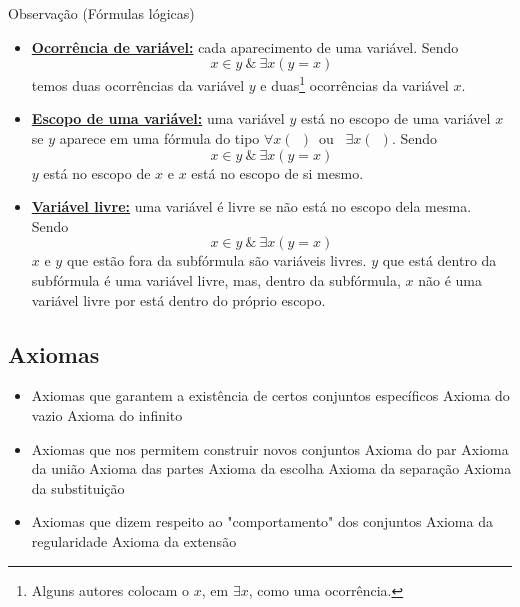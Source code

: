          \begin{mymdframed}{Observação (Fórmulas lógicas)}
            \begin{itemize}
               \item\textbf{\underline{Ocorrência de variável:}} cada aparecimento de uma variável.
                  Sendo $$x \in y\ \&\ \exists x (y = x)$$
                  temos duas ocorrências da variável $y$ e duas\footnote{Alguns autores colocam o $x$, em $\exists x$, como uma ocorrência.} ocorrências da variável $x$.
               \item \textbf{\underline{Escopo de uma variável:}} uma variável $y$ está no escopo de uma variável $x$ se $y$ aparece em uma fórmula do tipo $\forall x (\ \ )$\ ou \ $\exists x (\ \ )$.
                  Sendo $$x \in y\ \& \ \exists x (y = x)$$
                  $y$ está no escopo de $x$ e $x$ está no escopo de si mesmo.
               \item \textbf{\underline{Variável livre:}} uma variável é livre se não está no escopo dela mesma.
                  Sendo $$x \in y\ \& \ \exists x (y = x)$$
                  $x$ e $y$ que estão fora da subfórmula são variáveis livres. $y$ que está dentro da subfórmula é uma variável livre, mas, dentro da subfórmula, $x$ não é uma variável livre por está dentro do próprio escopo.
            \end{itemize}
         \end{mymdframed}

   \subsection{Axiomas}
      \begin{itemize}
         \item Axiomas que garantem a existência de certos conjuntos específicos
            \subitem Axioma do vazio
            \subitem Axioma do infinito    
         \item Axiomas que nos permitem construir novos conjuntos
            \subitem Axioma do par
            \subitem Axioma da união
            \subitem Axioma das partes
            \subitem Axioma da escolha
            \subitem Axioma da separação
            \subitem Axioma da substituição
         \item Axiomas que dizem respeito ao "comportamento" dos conjuntos
            \subitem Axioma da regularidade 
            \subitem Axioma da extensão
      \end{itemize}

